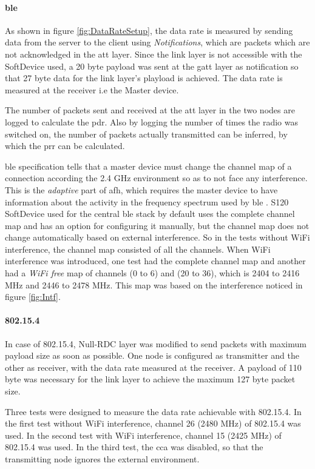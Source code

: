 \paragraph{\gls{ble} } As shown in figure \ref{fig:DataRateSetup}, the data rate is measured by sending data from the server to the client using \emph{Notifications}, which are packets which are not acknowledged in the \gls{att} layer. Since the link layer is not accessible with the SoftDevice used, a 20 byte payload was sent at the \gls{gatt} layer as notification so that 27 byte data for the link layer's playload is achieved. The data rate is measured at the receiver i.e the Master device. 

The number of packets sent and received at the \gls{att} layer in the two nodes are logged to calculate the \gls{pdr}. Also by logging the number of times the radio was switched on, the number of packets actually transmitted can be inferred, by which the \gls{prr} can be calculated.

\gls{ble}  specification tells that a master device must change the channel map of a connection according the 2.4 GHz environment so as to not face any interference. This is the \emph{adaptive} part of \gls{afh}, which requires the master device to have information about the activity in the frequency spectrum used by \gls{ble} . S120 SoftDevice used for the central \gls{ble}  stack by default uses the complete channel map and has an option for configuring it manually, but the channel map does not change automatically based on external interference. So in the tests without WiFi interference, the channel map consisted of all the channels. When WiFi interference was introduced, one test had the complete channel map and another had a \emph{WiFi free} map of channels (0 to 6) and (20 to 36), which is 2404 to 2416 MHz and 2446 to 2478 MHz. This map was based on the interference noticed in figure \ref{fig:Intf}.

\paragraph{802.15.4} In case of 802.15.4, Null-RDC layer was modified to send packets with maximum payload size as soon as possible. One node is configured as transmitter and the other as receiver, with the data rate measured at the receiver. A payload of 110 byte was necessary for the link layer to achieve the maximum 127 byte packet size.

Three tests were designed to measure the data rate achievable with 802.15.4. In the first test without WiFi interference, channel 26 (2480 MHz) of 802.15.4 was used. In the second test with WiFi interference, channel 15 (2425 MHz) of 802.15.4 was used. In the third test, the \gls{cca} was disabled, so that the transmitting node ignores the external environment.

